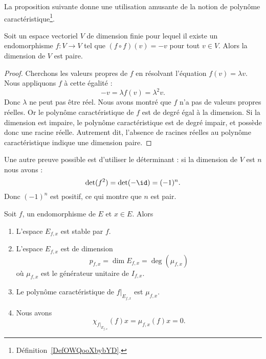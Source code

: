 La proposition suivante donne une utilisation amusante de la notion de polynôme caractéristique\footnote{Définition~\ref{DefOWQooXbybYD}.}.
\begin{proposition}
    Soit un espace vectoriel \( V\) de dimension finie pour lequel il existe un endomorphisme \( f\colon V\to V\) tel que \( (f\circ f)(v)=-v\) pour tout \( v\in V\). Alors la dimension de \( V\) est paire.
\end{proposition}

\begin{proof}
    Cherchons les valeurs propres de \( f\) en résolvant l'équation \( f(v)=\lambda v\). Nous appliquons \( f\) à cette égalité :
    \begin{equation}
        -v=\lambda f(v)=\lambda^2v.
    \end{equation}
    Donc \( \lambda\) ne peut pas être réel. Nous avons montré que \( f\) n'a pas de valeurs propres réelles. Or le polynôme caractéristique de \( f\) est de degré égal à la dimension. Si la dimension est impaire, le polynôme caractéristique est de degré impair, et possède donc une racine réelle. Autrement dit, l'absence de racines réelles au polynôme caractéristique indique une dimension paire.
\end{proof}

Une autre preuve possible est d'utiliser le déterminant : si la dimension de \( V\) est \( n\) nous avons :
\begin{equation}
    \det(f^2)=\det(-\id)=(-1)^n.
\end{equation}
Donc \( (-1)^n\) est positif, ce qui montre que \( n\) est pair.

\begin{proposition}\label{PropNrZGhT}
    Soit \( f\), un endomorphisme de \( E\) et \( x\in E\). Alors
    \begin{enumerate}
        \item
            L'espace \( E_{f,x}\) est stable par \( f\).
        \item\label{ItemfzKOCo}
            L'espace \( E_{f,x}\) est de dimension
            \begin{equation}
                p_{f,x}=\dim E_{f,x}=\deg(\mu_{f,x})
            \end{equation}
            où \( \mu_{f,x}\) est le générateur unitaire de \( I_{f,x}\).
        \item   \label{ItemKHNExH}
            Le polynôme caractéristique de \( f|_{E_{f,x}}\) est \( \mu_{f,x}\).
        \item   \label{ItemHMviZw}
            Nous avons
            \begin{equation}
                \chi_{f|_{E_{f,x}}}(f)x=\mu_{f,x}(f)x=0.
            \end{equation}
    \end{enumerate}
\end{proposition}

